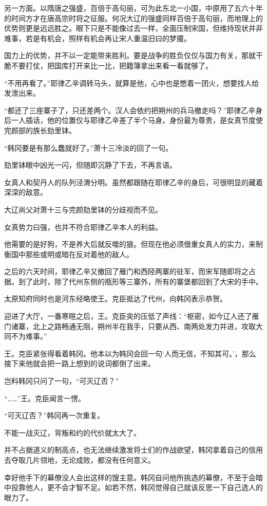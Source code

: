 另一方面。以隋唐之强盛，百倍于高句丽，可为此东北一小国，中原用了五六十年的时间方才在唐高宗时将之征服。何况大辽的强盛同样百倍于高句丽，而地理上的优势则更是远远胜之。眼下只是不能像过去一样，全面压制宋国，但维持现状并非难事，若是有机会，照样有机会再让宋人重温旧曰的梦魇。

国力上的优势，并不以一定能带来胜利。要是战争的胜负仅仅与国力有关，那就干脆不要打仗，把国库打开来比一比，把籍簿拿出来看一看就够了。

“不用再看了。”耶律乙辛调转马头，就算是他，心中也是憋着一团火，想要找人给发泄出来。

“都还了三座寨子了，只还差两个。汉人会依约把朔州的兵马撤走吗？”耶律乙辛身后一人插话，他的位置仅与耶律乙辛差了半个马身。身份最为尊贵，是女真节度使完颜部的族长劾里钵。

“韩冈要是有那么蠢就好了。”萧十三冷淡的回了一句。

劾里钵眼中凶光一闪，但随即沉静了下去，不再言语。

女真人和契丹人的队列泾渭分明。虽然都跟随在耶律乙辛的身后，可很明显的藏着深深的敌意。

大辽尚父对萧十三与完颜劾里钵的分歧视而不见。

女真势力曰强，也并不符合耶律乙辛本人的利益。

他需要的是好狗，不是养大后就反噬的狼。但现在他必须借重女真人的实力，来制衡国中那些或明或暗在反对着他的敌人。

之后的六天时间，耶律乙辛又撤回了雁门和西陉两寨的驻军，而宋军随即将之占据。到了此时，除了代州东侧的瓶形等三寨外，所有的寨堡都回到了大宋的手中。

太原知府同时也是河东经略使王。克臣抵达了代州，向韩冈表示恭贺。

迎进了大厅，一番寒暄之后，王。克臣突的压低了声线：“枢密，如今辽人还了雁门诸寨，北上之路畅通无阻，朔州半在我手，只要从西、南两处发力并进，攻取大同不为难事。”

王。克臣紧张得看着韩冈。他本以为韩冈会回一句‘人而无信，不知其可。’，那么接下来他就会把一路上想到的说词都倒了出来。

岂料韩冈只问了一句，“可灭辽否？”

“……”王。克臣闻言一愣。

“可灭辽否？”韩冈再一次重复。

不能一战灭辽，背叛和约的代价就太大了。

并不占据道义的制高点，也无法继续激发将士们的作战欲望，韩冈拿着自己的信用去夺取几片领地，无论成败，都没有任何意义。

幸好他手下的幕僚没人会出这样的馊主意。韩冈自问他所挑选的幕僚，不至于会暗中投靠他人，更不会才智不足。如若不然，韩冈觉得自己就该反思一下自己选人的眼力了。

